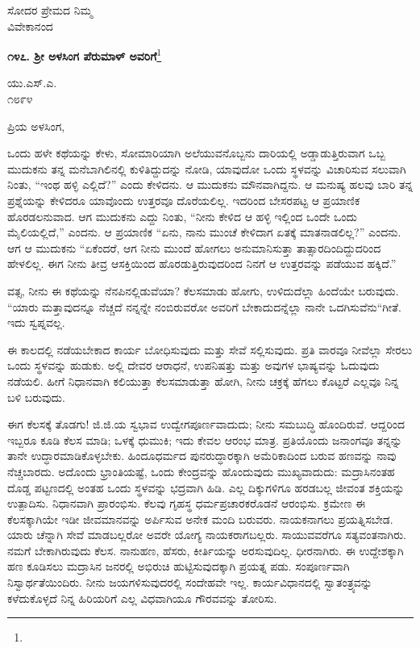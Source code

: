 \vspace{-0.4cm}

{\flushright
ಸೋದರ ಪ್ರೇಮದ ನಿಮ್ಮ\\ವಿವೇಕಾನಂದ\par}

\vspace{-0.5cm}

\begin{center}
\textbf{೧೪೭. ಶ‍್ರೀ ಅಳಸಿಂಗ ಪೆರುಮಾಳ್ ಅವರಿಗೆ}\footnote{}
\end{center}

\vspace{-0.6cm}

\begin{flushright}
ಯು.ಎಸ್.ಎ.\\೧೮೯೪
\end{flushright}

\vspace{-0.5cm}

\noindent
ಪ್ರಿಯ ಅಳಸಿಂಗ,

ಒಂದು ಹಳೇ ಕಥೆಯನ್ನು ಕೇಳು, ಸೋಮಾರಿಯಾಗಿ ಅಲೆಯುವನೊಬ್ಬನು ದಾರಿಯಲ್ಲಿ ಅಡ್ಡಾಡುತ್ತಿರುವಾಗ ಒಬ್ಬ ಮುದುಕನು ತನ್ನ ಮನೆಬಾಗಿಲಿನಲ್ಲಿ ಕುಳಿತಿದ್ದುದನ್ನು ನೋಡಿ, ಯಾವುದೋ ಒಂದು ಸ್ಥಳವನ್ನು ವಿಚಾರಿಸುವ ಸಲುವಾಗಿ ನಿಂತು, “ಇಂಥ ಹಳ್ಳಿ ಎಲ್ಲಿದೆ?” ಎಂದು ಕೇಳಿದನು. ಆ ಮುದುಕನು ಮೌನವಾಗಿದ್ದನು. ಆ ಮನುಷ್ಯ ಹಲವು ಬಾರಿ ತನ್ನ ಪ್ರಶ್ನೆಯನ್ನು ಕೇಳಿದರೂ ಯಾವೊಂದು ಉತ್ತರವೂ ದೊರೆಯಲಿಲ್ಲ. ಇದರಿಂದ ಬೇಸರಪಟ್ಟ ಆ ಪ್ರಯಾಣಿಕ ಹೊರಡಲನುವಾದ. ಆಗ ಮುದುಕನು ಎದ್ದು ನಿಂತು, “ನೀನು ಕೇಳಿದ ಆ ಹಳ್ಳಿ ಇಲ್ಲಿಂದ ಒಂದೇ ಒಂದು ಮೈಲಿಯಲ್ಲಿದೆ,” ಎಂದನು. ಆ ಪ್ರಯಾಣಿಕ “ಏನು, ನಾನು ಮುಂಚೆ ಕೇಳಿದಾಗ ಏತಕ್ಕೆ ಮಾತನಾಡಲಿಲ್ಲ?” ಎಂದನು. ಆಗ ಆ ಮುದುಕನು “ಏಕೆಂದರೆ, ಆಗ ನೀನು ಮುಂದೆ ಹೋಗಲು ಅನುಮಾನಿಸುತ್ತಾ ತಾತ್ಸಾರದಿಂದಿದ್ದುದರಿಂದ ಹೇಳಲಿಲ್ಲ. ಈಗ ನೀನು ತೀವ್ರ ಆಸಕ್ತಿಯಿಂದ ಹೊರಡುತ್ತಿರುವುದರಿಂದ ನಿನಗೆ ಆ ಉತ್ತರವನ್ನು ಪಡೆಯುವ ಹಕ್ಕಿದೆ.”

ವತ್ಸ, ನೀನು ಈ ಕಥೆಯನ್ನು ನೆನಪಿನಲ್ಲಿಡುವೆಯಾ? ಕೆಲಸಮಾಡು ಹೋಗು, ಉಳಿದುದೆಲ್ಲಾ ಹಿಂದೆಯೇ ಬರುವುದು. “ಯಾರು ಮತ್ತಾವುದನ್ನೂ ನೆಚ್ಚದೆ ನನ್ನನ್ನೇ ನಂಬಿರುವರೋ ಅವರಿಗೆ ಬೇಕಾದುದನ್ನೆಲ್ಲಾ ನಾನೇ ಒದಗಿಸುವೆನು“\enginline{-}ಗೀತೆ. ಇದು ಸ್ವಪ್ನವಲ್ಲ.

ಈ ಕಾಲದಲ್ಲಿ ನಡೆಯಬೇಕಾದ ಕಾರ್ಯ ಬೋಧಿಸುವುದು ಮತ್ತು ಸೇವೆ ಸಲ್ಲಿಸುವುದು. ಪ್ರತಿ ವಾರವೂ ನೀವೆಲ್ಲಾ ಸೇರಲು ಒಂದು ಸ್ಥಳವನ್ನು ಹುಡುಕು. ಅಲ್ಲಿ ದೇವರ ಆರಾಧನೆ, ಉಪನಿಷತ್ತು ಮತ್ತು ಅವುಗಳ ಭಾಷ್ಯವನ್ನು ಓದುವುದು ನಡೆಯಲಿ. ಹೀಗೆ ನಿಧಾನವಾಗಿ ಕಲಿಯುತ್ತಾ ಕೆಲಸಮಾಡುತ್ತಾ ಹೋಗಿ, ನೀನು ಚಕ್ರಕ್ಕೆ ಹೆಗಲು ಕೊಟ್ಟರೆ ಎಲ್ಲವೂ ನಿನ್ನ ಬಳಿ ಬರುವುದು.

ಈಗ ಕೆಲಸಕ್ಕೆ ತೊಡಗು! ಜಿ.ಜಿ.ಯ ಸ್ವಭಾವ ಉದ್ವೇಗಪೂರ್ಣವಾದುದು; ನೀನು ಸಮಬುದ್ಧಿ ಹೊಂದಿರುವೆ. ಆದ್ದರಿಂದ ಇಬ್ಬರೂ ಕೂಡಿ ಕೆಲಸ ಮಾಡಿ; ಒಳಕ್ಕೆ ಧುಮುಕಿ; ಇದು ಕೇವಲ ಆರಂಭ ಮಾತ್ರ. ಪ್ರತಿಯೊಂದು ಜನಾಂಗವೂ ತನ್ನನ್ನು ತಾನೇ ಉದ್ಧಾರಮಾಡಿಕೊಳ್ಳಬೇಕು. ಹಿಂದೂಧರ್ಮದ ಪುನರುದ್ಧಾರಕ್ಕಾಗಿ ಅಮೆರಿಕಾದಿಂದ ಬರುವ ಹಣವನ್ನು ನಾವು ನೆಚ್ಚಬಾರದು. ಅದೊಂದು ಭ್ರಾಂತಿಯಷ್ಟೆ, ಒಂದು ಕೇಂದ್ರವನ್ನು ಹೊಂದುವುದು ಮುಖ್ಯವಾದುದು: ಮದ್ರಾಸಿನಂತಹ ದೊಡ್ಡ ಪಟ್ಟಣದಲ್ಲಿ ಅಂತಹ ಒಂದು ಸ್ಥಳವನ್ನು ಭದ್ರವಾಗಿ ಹಿಡಿ. ಎಲ್ಲ ದಿಕ್ಕುಗಳಿಗೂ ಹರಡಬಲ್ಲ ಜೀವಂತ ಶಕ್ತಿಯನ್ನು ಉತ್ಪಾದಿಸು. ನಿಧಾನವಾಗಿ ಪ್ರಾರಂಭಿಸು. ಕೆಲವು ಗೃಹಸ್ಥ ಧರ್ಮಪ್ರಚಾರಕರೊಡನೆ ಆರಂಭಿಸು. ಕ್ರಮೇಣ ಈ ಕೆಲಸಕ್ಕಾಗಿಯೇ ಇಡೀ ಜೀವಮಾನವನ್ನು ಅರ್ಪಿಸುವ ಅನೇಕ ಮಂದಿ ಬರುವರು. ನಾಯಕನಾಗಲು ಪ್ರಯತ್ನಿಸಬೇಡ. ಯಾರು ಚೆನ್ನಾಗಿ ಸೇವೆ ಮಾಡಬಲ್ಲರೋ ಅವರೇ ಯೋಗ್ಯ ನಾಯಕರಾಗಬಲ್ಲರು. ಸಾಯುವವರೆಗೂ ಸತ್ಯವಂತನಾಗಿರು. ನಮಗೆ ಬೇಕಾಗಿರುವುದು ಕೆಲಸ. ನಾನುಹಣ, ಹೆಸರು, ಕೀರ್ತಿಯನ್ನು ಅರಸುವುದಿಲ್ಲ. ಧೀರನಾಗಿರು. ಈ ಉದ್ದೇಶಕ್ಕಾಗಿ ಹಣ ಕೂಡಿಸಲು ಮದ್ರಾಸಿನ ಜನರಲ್ಲಿ ಅಭಿರುಚಿ ಹುಟ್ಟಿಸುವುದಕ್ಕಾಗಿ ಪ್ರಯತ್ನ ಪಡು. ಸಂಪೂರ್ಣವಾಗಿ ನಿಸ್ವಾರ್ಥತೆಯಿಂದಿರು. ನೀನು ಜಯಗಳಿಸುವುದರಲ್ಲಿ ಸಂದೇಹವೇ ಇಲ್ಲ. ಕಾರ್ಯವಿಧಾನದಲ್ಲಿ ಸ್ವಾತಂತ್ರ್ಯವನ್ನು ಕಳೆದುಕೊಳ್ಳದೆ ನಿನ್ನ ಹಿರಿಯರಿಗೆ ಎಲ್ಲ ವಿಧವಾಗಿಯೂ ಗೌರವವನ್ನು ತೋರಿಸು.

